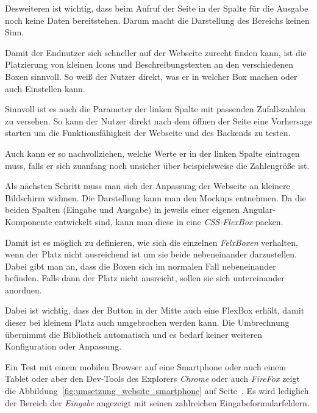 Desweiteren ist wichtig, dass beim Aufruf der Seite in der Spalte für die Ausgabe noch keine Daten bereitstehen. Darum
macht die Darstellung des Bereichs keinen Sinn.

Damit der Endnutzer sich schneller auf der Webseite zurecht finden kann, ist die Platzierung von kleinen Icons und
Beschreibungstexten an den verschiedenen Boxen sinnvoll. So weiß der Nutzer direkt, was er in welcher Box machen oder
auch Einstellen kann.

Sinnvoll ist es auch die Parameter der linken Spalte mit passenden Zufallszahlen zu versehen. So kann der Nutzer direkt
nach dem öffnen der Seite eine Vorhersage starten um die Funktionsfähigkeit der Webseite und des Backends zu testen.

Auch kann er so nachvollziehen, welche Werte er in der linken Spalte eintragen muss, falls er sich zuanfang noch
unsicher über beispielsweise die Zahlengröße ist.

Als nächsten Schritt muss man sich der Anpassung der Webseite an kleinere Bildschirm widmen. Die Darstellung kann man
den Mockups entnehmen. Da die beiden Spalten (Eingabe und Ausgabe) in jeweils einer eigenen Angular-Komponente
entwickelt sind, kann man diese in eine \textit{CSS-FlexBox} packen.

Damit ist es möglich zu definieren, wie sich die einzelnen \textit{FelxBoxen} verhalten, wenn der Platz nicht
ausreichend ist um sie beide nebeneinander darzustellen. Dabei gibt man an, dass die Boxen sich im normalen Fall
nebeneinander befinden. Falls dann der Platz nicht ausreicht, sollen sie sich untereinander anordnen.

Dabei ist wichtig, dass der Button in der Mitte auch eine FlexBox erhält, damit dieser bei kleinem Platz auch
umgebrochen werden kann. Die Umbrechnung übernimmt die Bibliothek automatisch und es bedarf keiner weiteren
Konfiguration oder Anpassung.

Ein Test mit einem mobilen Browser auf eine Smartphone oder auch einem Tablet oder aber den Dev-Tools des Explorers
\textit{Chrome} oder auch \textit{FireFox} zeigt die Abbildung~\ref{fig:umsetzung_website_smartphone} auf
Seite~\pageref{fig:umsetzung_website_smartphone}. Es wird lediglich der Bereich der \textit{Eingabe} angezeigt mit
seinen zahlreichen Eingabeformularfeldern.

